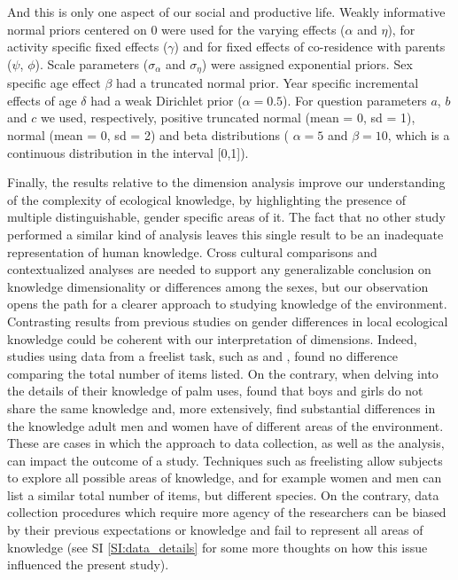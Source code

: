 And this is only one aspect of our social and productive life.  
Weakly informative normal priors centered on 0 were used for the varying effects ($\alpha$ and $\eta$), for activity specific fixed effects ($\gamma$) and for fixed effects of co-residence with parents ($\psi$, $\phi$). Scale parameters ($\sigma_{\alpha}$ and $\sigma_{\eta}$) were assigned exponential priors. Sex specific age effect $\beta$ had a truncated normal prior. Year specific incremental effects of age $\delta$ had a weak Dirichlet prior ($\alpha = 0.5$). 
For question parameters $a$, $b$ and $c$ we used, respectively, positive truncated normal (mean = 0, sd = 1), normal (mean = 0, sd = 2) and beta distributions ( $\alpha = 5$ and $\beta = 10$, which is a continuous distribution in the interval [0,1]).


Finally, the results relative to the dimension analysis improve our understanding of the complexity of ecological knowledge, by highlighting the presence of multiple distinguishable, gender specific areas of it. The fact that no other study performed a similar kind of analysis leaves this single result to be an inadequate representation of human knowledge. Cross cultural comparisons and contextualized analyses are needed to support any generalizable conclusion on knowledge dimensionality or differences among the sexes, but our observation opens the path for a clearer approach to studying knowledge of the environment. Contrasting results from previous studies on gender differences in local ecological knowledge could be coherent with our interpretation of dimensions. Indeed, studies using data from a freelist task, such as \cite{Cruz-garciaChildrenThe}  and \cite{Geng2016TraditionalProvince}, found no difference comparing the total number of items listed. On the contrary, when delving into the details of their knowledge of palm uses, \cite{Blacutt-Rivero2016LocalBolivia} found that boys and girls do not share the same knowledge and, more extensively, \cite{Schniter2021Age-AppropriateChoyeros} find substantial differences in the knowledge adult men and women have of different areas of the environment. These are cases in which the approach to data collection, as well as the analysis, can impact the outcome of a study. Techniques such as freelisting allow subjects to explore all possible areas of knowledge, and for example women and men can list a similar total number of items, but different species. On the contrary, data collection procedures which require more agency of the researchers can be biased by their previous expectations or knowledge and fail to represent all areas of knowledge (see SI \ref{SI:data_details} for some more thoughts on how this issue influenced the present study).




